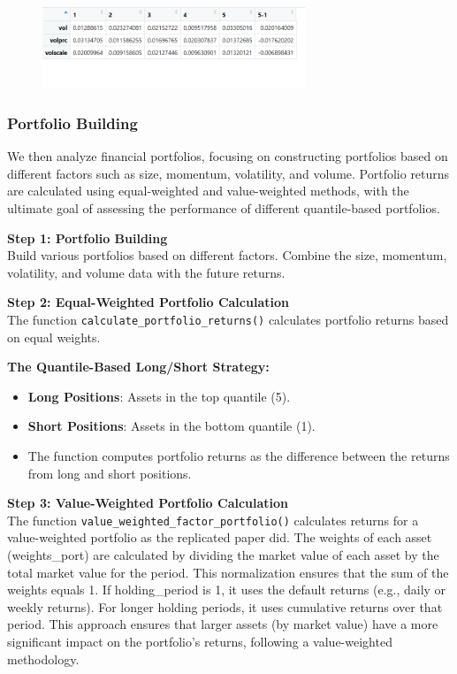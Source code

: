 \documentclass{article}
\begin{document}
\begin{figure}[H]
    \centering
    \includegraphics[width=0.7\textwidth]{24.png}
    \label{fig:example}
\end{figure}

\hypertarget{Portfolio Building}{%
\subsubsection{Portfolio Building}\label{Portfolio Building}}
We then analyze financial portfolios, focusing on constructing portfolios based on different factors such as size, momentum, volatility, and volume. Portfolio returns are calculated using equal-weighted and value-weighted methods, with the ultimate goal of assessing the performance of different quantile-based portfolios.

\textbf{Step 1: Portfolio Building}\\
Build various portfolios based on different factors. Combine the size, momentum, volatility, and volume data with the future returns.

\textbf{Step 2: Equal-Weighted Portfolio Calculation}\\
The function \texttt{calculate\_portfolio\_returns()} calculates portfolio returns based on equal weights.

\textbf{The Quantile-Based Long/Short Strategy:}
\begin{itemize}
    \item \textbf{Long Positions}: Assets in the top quantile (5).
    \item \textbf{Short Positions}: Assets in the bottom quantile (1).
    \item The function computes portfolio returns as the difference between the returns from long and short positions.
\end{itemize}

\textbf{Step 3: Value-Weighted Portfolio Calculation}\\
The function \texttt{value\_weighted\_factor\_portfolio()} calculates returns for a value-weighted portfolio as the replicated paper did. The weights of each asset (weights\_port) are calculated by dividing the market value of each asset by the total market value for the period. This normalization ensures that the sum of the weights equals 1. If holding\_period is 1, it uses the default returns (e.g., daily or weekly returns). For longer holding periods, it uses cumulative returns over that period.
This approach ensures that larger assets (by market value) have a more significant impact on the portfolio's returns, following a value-weighted methodology.
\end{document}
